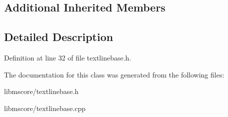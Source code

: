 \subsection*{Additional Inherited Members}


\subsection{Detailed Description}


Definition at line 32 of file textlinebase.\+h.



The documentation for this class was generated from the following files\+:\begin{DoxyCompactItemize}
\item 
libmscore/textlinebase.\+h\item 
libmscore/textlinebase.\+cpp\end{DoxyCompactItemize}

